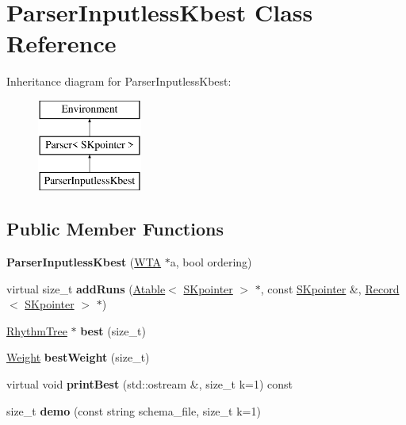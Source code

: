 \hypertarget{classParserInputlessKbest}{}\section{Parser\+Inputless\+Kbest Class Reference}
\label{classParserInputlessKbest}
Inheritance diagram for Parser\+Inputless\+Kbest\+:\begin{figure}[H]
\begin{center}
\leavevmode
\includegraphics[height=3.000000cm]{classParserInputlessKbest}
\end{center}
\end{figure}
\subsection*{Public Member Functions}
\begin{DoxyCompactItemize}
\item 
\mbox{\label{classParserInputlessKbest_a3440096e3c87f9fe8c16d432fbc4ebdb}} 
{\bfseries Parser\+Inputless\+Kbest} (\mbox{\hyperlink{classWTA}{W\+TA}} $\ast$a, bool ordering)
\item 
\mbox{\label{classParserInputlessKbest_ad2c0f66cb6e37a34c69ae118f60a9754}} 
virtual size\+\_\+t {\bfseries add\+Runs} (\mbox{\hyperlink{classAtable}{Atable}}$<$ \mbox{\hyperlink{classSKpointer}{S\+Kpointer}} $>$ $\ast$, const \mbox{\hyperlink{classSKpointer}{S\+Kpointer}} \&, \mbox{\hyperlink{classRecord}{Record}}$<$ \mbox{\hyperlink{classSKpointer}{S\+Kpointer}} $>$ $\ast$)
\item 
\mbox{\label{classParserInputlessKbest_afa91d93ca25af6897b217f95980ed045}} 
\mbox{\hyperlink{classRhythmTree}{Rhythm\+Tree}} $\ast$ {\bfseries best} (size\+\_\+t)
\item 
\mbox{\label{classParserInputlessKbest_a3d02503db194bf5bcdcb71113f40bf3b}} 
\mbox{\hyperlink{classWeight}{Weight}} {\bfseries best\+Weight} (size\+\_\+t)
\item 
\mbox{\label{classParserInputlessKbest_a69700b14fd2d75ee96da27956d6f7625}} 
virtual void {\bfseries print\+Best} (std\+::ostream \&, size\+\_\+t k=1) const
\item 
\mbox{\label{classParserInputlessKbest_a8380d62db00ce5ee5209e3962c9fca44}} 
size\+\_\+t {\bfseries demo} (const string schema\+\_\+file, size\+\_\+t k=1)
\end{DoxyCompactItemize}
